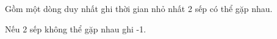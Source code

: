 Gồm một dòng duy nhất ghi thời gian nhỏ nhất 2 sếp có thể gặp nhau.

Nếu 2 sếp không thể gặp nhau ghi -1.